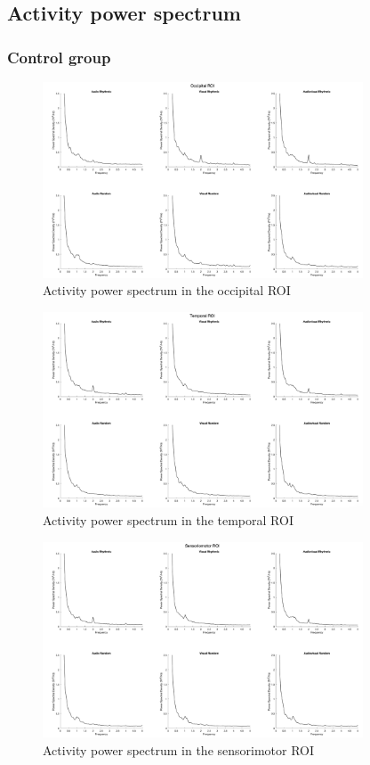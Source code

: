 \clearpage
\subsection*{Activity power spectrum}
\subsubsection*{Control group}
\begin{figure}[H]
    \centering
    \includegraphics[width=0.85\textwidth]{healthy_images/occipitalROI_graph.png}
    \caption{Activity power spectrum in the occipital ROI}
    \label{fig: occipital ROI: control}
\end{figure}
\begin{figure}[H]
    \centering
    \includegraphics[width=0.85\textwidth]{healthy_images/temporalROI_graph.png}
    \caption{Activity power spectrum  in the temporal ROI}
    \label{fig: temporal ROI: control}
\end{figure}
\begin{figure}[H]
    \centering
    \includegraphics[width=0.85\textwidth]{healthy_images/sensorimotorROI_graph.png}
    \caption{Activity power spectrum in the sensorimotor ROI}
    \label{fig: sensorimotor ROI: control} 
\end{figure} 

